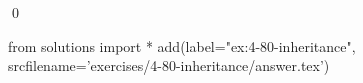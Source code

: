 
\begin{ex}
  \label{ex:4-80-inheritance}
  
  \qed
\end{ex}
\begin{python0}
from solutions import *
add(label="ex:4-80-inheritance",
    srcfilename='exercises/4-80-inheritance/answer.tex')
\end{python0}

